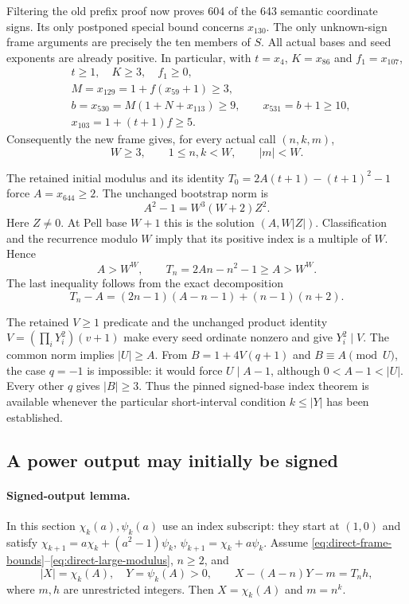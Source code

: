 Filtering the old prefix proof now proves 604 of the 643 semantic
coordinate signs.  Its only postponed special bound concerns $x_{130}$.
The only unknown-sign frame arguments are precisely the ten members
of $S$.  All actual bases and seed exponents are already positive.
In particular, with $t=x_4$, $K=x_{86}$ and $f_1=x_{107}$,
\begin{align*}
 &t\ge1,\quad K\ge3,\quad f_1\ge0,\\
 &M=x_{129}=1+f(x_{59}+1)\ge3,\\
 &b=x_{530}=M(1+N+x_{113})\ge9,\qquad x_{531}=b+1\ge10,\\
 &x_{103}=1+(t+1)f\ge5.
\end{align*}
Consequently the new frame gives, for every actual call $(n,k,m)$,
\begin{equation}
 W\ge3,\qquad 1\le n,k<W,\qquad |m|<W.
 \label{eq:direct-frame-bounds}
\end{equation}

The retained initial modulus and its identity
$T_0=2A(t+1)-(t+1)^2-1$ force $A=x_{644}\ge2$.
The unchanged bootstrap norm is
\[
 A^2-1=W^3(W+2)Z^2.
\]
Here $Z\ne0$.  At Pell base $W+1$ this is the solution
$(A,W|Z|)$.  Classification and the recurrence modulo $W$ imply
that its positive index is a multiple of $W$.  Hence
\begin{equation}
 A>W^W,
 \qquad T_n=2An-n^2-1\ge A>W^W.
 \label{eq:direct-large-modulus}
\end{equation}
The last inequality follows from the exact decomposition
\[
 T_n-A=(2n-1)(A-n-1)+(n-1)(n+2).
\]

The retained $V\ge1$ predicate and the unchanged product identity
$V=(\prod_iY_i^2)(v+1)$ make every seed ordinate nonzero and give
$Y_i^2\mid V$.  The common norm implies $|U|\ge A$.  From
$B=1+4V(q+1)$ and $B\equiv A\pmod U$, the case $q=-1$ is impossible:
it would force $U\mid A-1$, although $0<A-1<|U|$.  Every other $q$
gives $|B|\ge3$.  Thus the pinned signed-base index theorem is
available whenever the particular short-interval condition
$k\le |Y|$ has been established.

\subsection{A power output may initially be signed}

\paragraph{Signed-output lemma.}
In this section $\chi_k(a),\psi_k(a)$ use an index subscript:
they start at $(1,0)$ and satisfy
$\chi_{k+1}=a\chi_k+(a^2-1)\psi_k$,
$\psi_{k+1}=\chi_k+a\psi_k$.
Assume \eqref{eq:direct-frame-bounds}--\eqref{eq:direct-large-modulus},
$n\ge2$, and
\[
 |X|=\chi_k(A),\quad Y=\psi_k(A)>0,\qquad
 X-(A-n)Y-m=T_nh,
\]
where $m,h$ are unrestricted integers.  Then
$X=\chi_k(A)$ and $m=n^k$.

